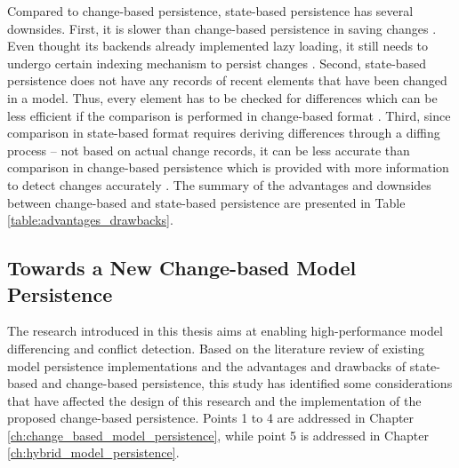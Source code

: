 Compared to change-based persistence, state-based persistence has several downsides. First, it is slower than change-based persistence in saving changes \cite{mens2002state}. Even thought its backends already implemented lazy loading, it still needs to undergo certain indexing mechanism to persist changes \cite{daniel2016neoemf,DBLP:conf/models/Espinazo-PaganCM11,eclipse2019cdo}. Second, state-based persistence does not have any records of recent elements that have been changed in a model. Thus, every element has to be checked for differences which can be less efficient if the comparison is performed in change-based format \cite{DBLP:conf/edoc/KoegelHLHD10}. Third, since comparison in state-based format requires deriving differences through a diffing process -- not based on actual change records, it can be less accurate than comparison in change-based persistence which is provided with more information to detect changes accurately \cite{mens2002state,DBLP:conf/edoc/KoegelHLHD10}. The summary of the advantages and downsides between change-based and state-based persistence are presented in Table \ref{table:advantages_drawbacks}.

\subsection{Towards a New Change-based Model Persistence}
\label{sec:a_new_change_based_persistence}
The research introduced in this thesis aims at enabling high-performance model differencing and conflict detection. Based on the literature review of existing model persistence implementations and the advantages and drawbacks of state-based and change-based persistence, this study has identified some considerations that have affected the design of this research and the implementation of the proposed change-based persistence. Points 1 to 4 are addressed in Chapter \ref{ch:change_based_model_persistence}, while point 5 is addressed in Chapter \ref{ch:hybrid_model_persistence}.

